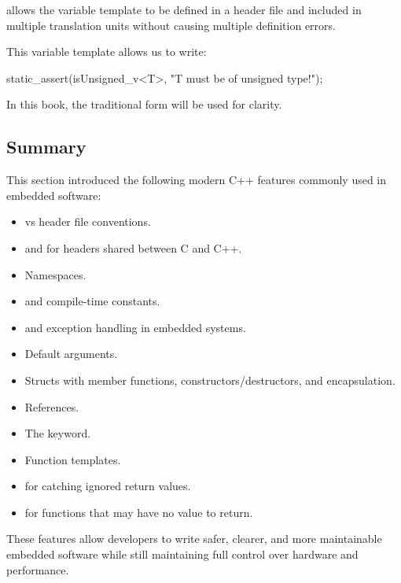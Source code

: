 \note {} allows the variable template to be defined in a header file and included in
multiple translation units without causing multiple definition errors.

This variable template allows us to write:

\begin{cppcode}
static_assert(isUnsigned_v<T>, "T must be of unsigned type!");
\end{cppcode}

\noindent In this book, the traditional form  will be used for clarity.

\subsection{Summary}
\label{c1:sec:cppsummary}
This section introduced the following modern C++ features commonly used in embedded software:
\begin{itemize}
  \item {} vs  header file conventions.
  \item {} and  for headers shared between C and C++.
  \item Namespaces.
  \item {} and compile-time constants.
  \item {} and exception handling in embedded systems.
  \item Default arguments.
  \item Structs with member functions, constructors/destructors, and encapsulation.
  \item References.
  \item The  keyword.
  \item Function templates.
  \item \code{[[nodiscard]]} for catching ignored return values.
  \item {} for functions that may have no value to return.
\end{itemize}
These features allow developers to write safer, clearer, and more maintainable embedded software
while still maintaining full control over hardware and performance.

